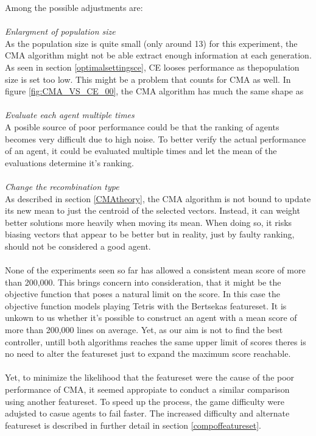 Among the possible adjustments are:\\
\\
\textit{Enlargment of population size}\\
As the population size is quite small (only around 13)
for this experiment, the CMA algorithm might not be able
extract enough information at each generation. As seen in 
section \ref{optimalsettingsce}, CE looses performance as 
thepopulation size is set too low. This might be a problem 
that counts for CMA as well. In figure \ref{fig:CMA_VS_CE_00},
the CMA algorithm has much the same shape as \\
\\
\textit{Evaluate each agent multiple times}\\
A posible source of poor performance could be 
that the ranking of agents becomes very difficult
due to high noise. To better verify the actual
performance of an agent, it could be evaluated 
multiple times and let the mean of the evaluations
determine it's ranking.\\
\\
\textit{Change the recombination type}\\
As described in section \ref{CMAtheory}, 
the CMA algorithm is not bound to update its 
new mean to just the centroid of the selected 
vectors. Instead, it can weight better solutions
more heavily when moving its mean. When doing so,
it risks biasing vectors that appear to be better 
but in reality, just by faulty ranking, should
not be considered a good agent.\\
\\
None of the experiments seen so far has allowed a 
consistent mean score of more 
than 200,000. This brings concern into 
consideration, that it might be the objective function
that poses a natural limit on the score.
In this case the objective function
models playing Tetris with the Bertsekas featureset. 
It is unkown to us
whether it's possible to construct an agent 
with a mean score of more than
200,000 lines on average. 
Yet, as our aim is not to find the best controller,
untill both algorithms reaches the same upper limit 
of scores theres is no need
to alter the featureset just to
expand the maximum score reachable.\\
\\
Yet, to minimize the likelihood 
that the featureset were the cause of the 
poor performance of CMA, it seemed 
appropiate to conduct a similar comparison 
using another featureset. 
To speed up the process, the game difficulty were 
adujsted to casue agents to fail faster.
The increased difficulty and alternate
featureset is described in 
further detail in section \ref{compoffeatureset}.

